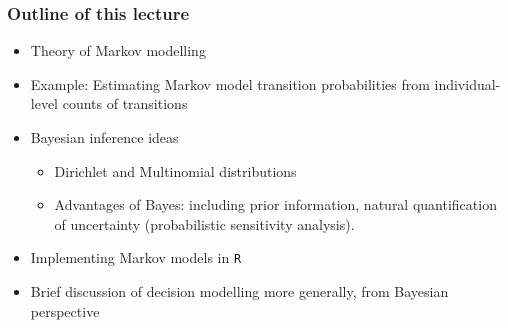 
\begin{frame}
  
\frametitle{Outline of this lecture} 

\begin{itemize}

\item Theory of Markov modelling

\item Example: Estimating Markov model transition probabilities from
  individual-level counts of transitions

\item Bayesian inference ideas
  \begin{itemize}
  \item Dirichlet and Multinomial distributions
  \item Advantages of Bayes: including prior information, natural
    quantification of uncertainty (probabilistic sensitivity
    analysis).
  \end{itemize}

\item Implementing Markov models in \texttt{R}

\item Brief discussion of decision modelling more generally, from
  Bayesian perspective
\end{itemize}


\end{frame}





